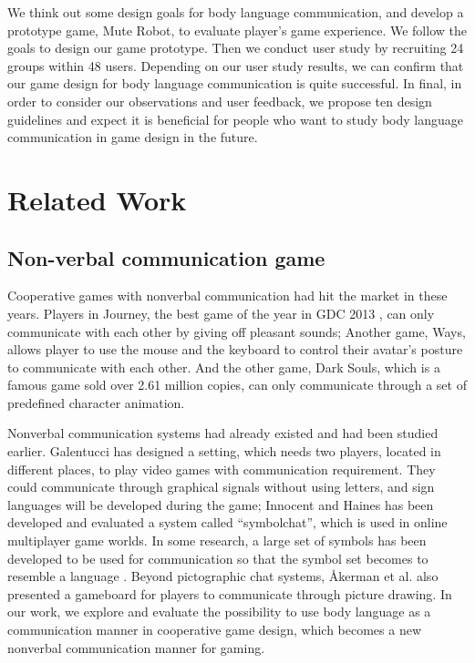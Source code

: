 \documentclass{sigchi}
\begin{document}
We think out some design goals for body language communication, and develop a prototype game, Mute Robot, to evaluate player's game experience. We follow the goals to design our game prototype. Then we conduct user study by recruiting 24 groups within 48 users. Depending on our user study results, we can confirm that our game design for body language communication is quite successful. In final, in order to consider our observations and user feedback, we propose ten design guidelines and expect it is beneficial for people who want to study body language communication in game design in the future. 


\section{Related Work}
\subsection{Non-verbal communication game}

Cooperative games with nonverbal communication had hit the market in these years. Players in Journey, the best game of the year in GDC 2013 \cite{I0}, can only communicate with each other by giving off pleasant sounds; Another game, Ways, allows player to use the mouse and the keyboard to control their avatar's posture to communicate with each other. And the other game, Dark Souls, which is a famous game sold over 2.61 million copies, can only communicate through a set of predefined character animation.

Nonverbal communication systems had already existed and had been studied earlier. 
Galentucci \cite{I1} has designed a setting, which needs two players, located in different places, to play video games with communication requirement.
They could communicate through graphical signals without using letters, and sign languages will be developed during the game; 
Innocent and Haines \cite{I2} has been developed and evaluated a system called ``symbolchat'', which is used in online multiplayer game worlds. In some research, a large set of symbols has been developed to be used for communication so that the symbol set becomes to resemble a language \cite{I3,I4}. Beyond pictographic chat systems, Åkerman et al. \cite{I5} also presented a gameboard for players to communicate through picture drawing. In our work, we explore and evaluate the possibility to use body language as a communication manner in cooperative game design, which becomes a new nonverbal communication manner for gaming.
\end{document}
